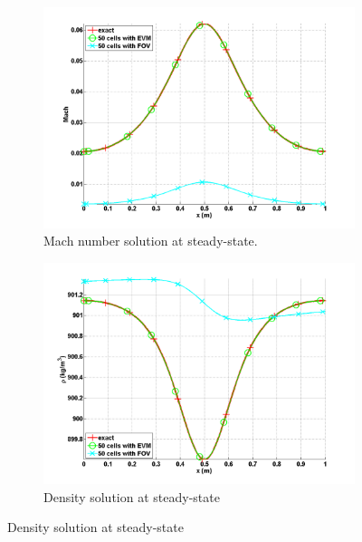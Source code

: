 \documentclass[preprint,10pt]{elsarticle}
\begin{document}
\begin{figure}[H]
        \centering
        \begin{subfigure}[b]{0.495\textwidth}
                \centering
                \includegraphics[width=\textwidth]{liquid_mach_numerical_and_exact_50.png}
                \caption{Mach number solution at steady-state.}
                \label{fig:1d_nozzle_liq_vel}
        \end{subfigure}%
        \begin{subfigure}[b]{0.495\textwidth}
                \centering
                \includegraphics[width=\textwidth]{liquid_density_numerical_and_exact_50.png}
                \caption{Density solution at steady-state}

\end{subfigure}
\end{figure}
\end{document}
